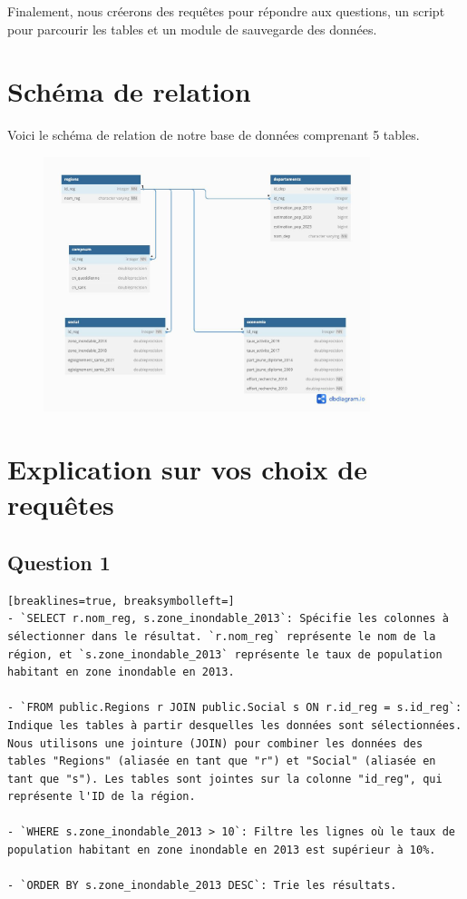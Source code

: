 \documentclass[a4paper, 11pt]{article}
\begin{document}
Finalement, nous créerons des requêtes pour répondre aux questions, un script pour parcourir les tables et un module de sauvegarde des données.\\
\section{Schéma de relation}
Voici le schéma de relation de notre base de données comprenant 5 tables.\\



\begin{figure}[h]
    \centering
    \includegraphics[width=0.85\textwidth]{Schema_BDD.jpg}
\end{figure}

\section{Explication sur vos choix de requêtes}
\subsection{Question 1}
\begin{Verbatim}[breaklines=true, breaksymbolleft=]
- `SELECT r.nom_reg, s.zone_inondable_2013`: Spécifie les colonnes à sélectionner dans le résultat. `r.nom_reg` représente le nom de la région, et `s.zone_inondable_2013` représente le taux de population habitant en zone inondable en 2013.

- `FROM public.Regions r JOIN public.Social s ON r.id_reg = s.id_reg`: Indique les tables à partir desquelles les données sont sélectionnées. Nous utilisons une jointure (JOIN) pour combiner les données des tables "Regions" (aliasée en tant que "r") et "Social" (aliasée en tant que "s"). Les tables sont jointes sur la colonne "id_reg", qui représente l'ID de la région.

- `WHERE s.zone_inondable_2013 > 10`: Filtre les lignes où le taux de population habitant en zone inondable en 2013 est supérieur à 10%.

- `ORDER BY s.zone_inondable_2013 DESC`: Trie les résultats.
\end{Verbatim}
\end{document}
